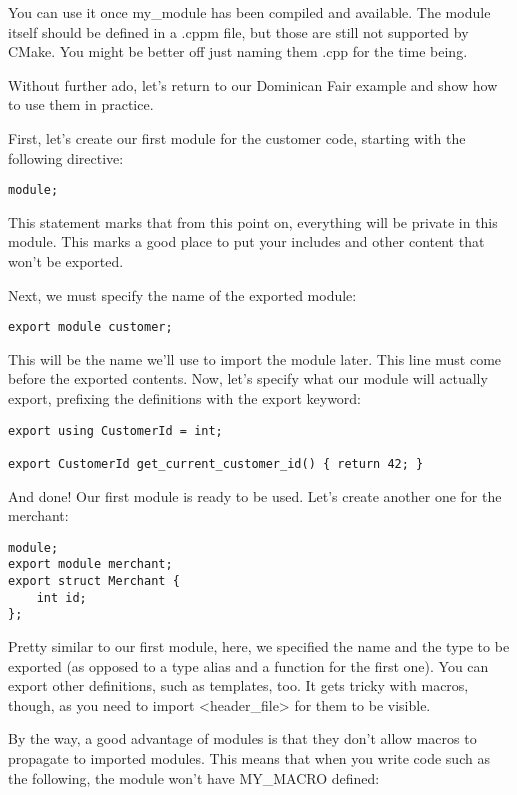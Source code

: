 You can use it once my\_module has been compiled and available. The module itself should be defined in a .cppm file, but those are still not supported by CMake. You might be better off just naming them .cpp for the time being.

Without further ado, let's return to our Dominican Fair example and show how to use them in practice.

First, let's create our first module for the customer code, starting with the following directive:

\begin{lstlisting}[style=styleCXX]
module;
\end{lstlisting}

This statement marks that from this point on, everything will be private in this module. This marks a good place to put your includes and other content that won't be exported.

Next, we must specify the name of the exported module:

\begin{lstlisting}[style=styleCXX]
export module customer;
\end{lstlisting}

This will be the name we'll use to import the module later. This line must come before the exported contents. Now, let's specify what our module will actually export, prefixing the definitions with the export keyword:

\begin{lstlisting}[style=styleCXX]
export using CustomerId = int;

export CustomerId get_current_customer_id() { return 42; }
\end{lstlisting}

And done! Our first module is ready to be used. Let's create another one for the merchant:

\begin{lstlisting}[style=styleCXX]
module;
export module merchant;
export struct Merchant {
	int id;
};
\end{lstlisting}

Pretty similar to our first module, here, we specified the name and the type to be exported (as opposed to a type alias and a function for the first one). You can export other definitions, such as templates, too. It gets tricky with macros, though, as you need to import <header\_file> for them to be visible.

By the way, a good advantage of modules is that they don't allow macros to propagate to imported modules. This means that when you write code such as the following, the module won't have MY\_MACRO defined:

